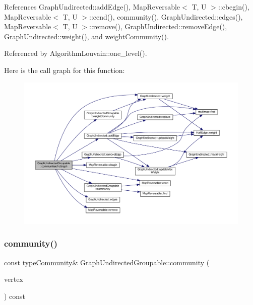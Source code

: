References Graph\+Undirected\+::add\+Edge(), Map\+Reversable$<$ T, U $>$\+::cbegin(), Map\+Reversable$<$ T, U $>$\+::cend(), community(), Graph\+Undirected\+::edges(), Map\+Reversable$<$ T, U $>$\+::remove(), Graph\+Undirected\+::remove\+Edge(), Graph\+Undirected\+::weight(), and weight\+Community().



Referenced by Algorithm\+Louvain\+::one\+\_\+level().

Here is the call graph for this function\+:\nopagebreak
\begin{figure}[H]
\begin{center}
\leavevmode
\includegraphics[width=350pt]{classGraphUndirectedGroupable_af6fc2c9e8aad7c6bce37d30eeaf184a8_cgraph}
\end{center}
\end{figure}
\mbox{\label{classGraphUndirectedGroupable_ad40474d566b3f9fbe9d132fbbe562ed5}} 
\subsubsection{\texorpdfstring{community()}{community()}\hspace{0.1cm}{\footnotesize\ttfamily [1/2]}}
{\footnotesize\ttfamily const \hyperlink{graphUndirectedGroupable_8h_a914da95c9ea7f14f4b7f875c36818556}{type\+Community}\& Graph\+Undirected\+Groupable\+::community (\begin{DoxyParamCaption}\item[{const \hyperlink{edge_8h_a5fbd20c46956d479cb10afc9855223f6}{type\+Vertex} \&}]{vertex }\end{DoxyParamCaption}) const\hspace{0.3cm}{\ttfamily [inline]}}


